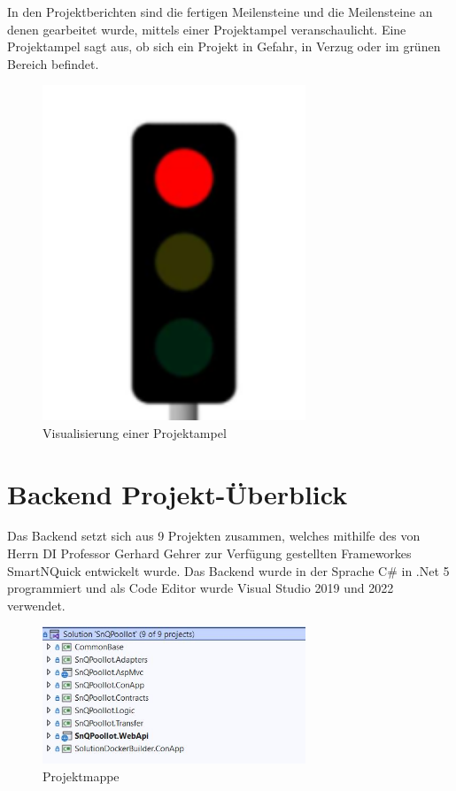 In den Projektberichten sind die fertigen Meilensteine und die  Meilensteine an denen gearbeitet wurde, mittels einer Projektampel veranschaulicht.
Eine Projektampel sagt aus, ob sich ein Projekt in Gefahr, in Verzug oder im grünen Bereich befindet.


\begin{figure}[H]
    \centering
    \includegraphics[width=0.7\textwidth]{pics/Projektampel.png}
    \caption{Visualisierung einer Projektampel}
\end{figure}

\section{Backend Projekt-Überblick}

Das Backend setzt sich aus 9 Projekten zusammen, welches mithilfe des von Herrn DI Professor Gerhard Gehrer zur Verfügung gestellten Frameworkes SmartNQuick entwickelt wurde.
Das Backend wurde in der Sprache C\# in .Net 5 programmiert und als Code Editor wurde
Visual Studio 2019 und 2022 verwendet.
 


\begin{figure}[H]
    \centering
    \includegraphics[width=0.7\textwidth]{pics/Projektmappe.JPG}
    \caption{Projektmappe}
\end{figure}


